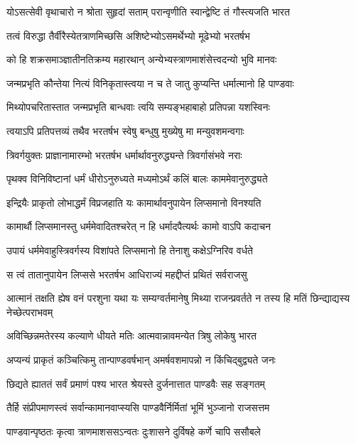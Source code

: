 \twolineshloka
{योऽसत्सेवी वृथाचारो न श्रोता सुहृदां सताम्}
{परान्वृणीति स्वान्द्वेष्टि तं गौस्त्यजति भारत}


\twolineshloka
{तत्वं विरुद्धा तैर्वीरैस्येतत्राणमिच्छसि}
{अशिष्टेभ्योऽसमर्थेभ्यो मूढेभ्यो भरतर्षभ}


\twolineshloka
{को हि शक्रसमाञ्ज्ञातीनतिक्रम्य महारथान्}
{अन्येभ्यस्त्राणमाशंसेत्त्वदन्यो भुवि मानवः}


\twolineshloka
{जन्मप्रभृति कौन्तेया नित्यं विनिकृतास्त्वया}
{न च ते जातु कुप्यन्ति धर्मात्मानो हि पाण्डवाः}


\twolineshloka
{मिथ्योपचरितास्तात जन्मप्रभृति बान्धवाः}
{त्वयि सम्यङ्भहाबाहो प्रतिपन्ना यशस्विनः}


\twolineshloka
{त्वयाऽपि प्रतिपत्तव्यं तथैव भरतर्षभ}
{स्वेषु बन्धुषु मुख्येषु मा मन्युवशमन्वगाः}


\twolineshloka
{त्रिवर्गयुक्तः प्राज्ञानामारम्भो भरतर्षभ}
{धर्मार्थावनुरुद्ध्यन्ते त्रिवर्गासंभवे नराः}


\twolineshloka
{पृथक्व विनिविष्टानां धर्मं धीरोऽनुरुध्यते}
{मध्यमोऽर्थं कलिं बालः काममेवानुरुद्ध्यते}


\twolineshloka
{इन्द्रियैः प्राकृतो लोभाद्धर्मं विप्रजहाति यः}
{कामार्थावनुपायेन लिप्समानो विनश्यति}


\twolineshloka
{कामार्थौ लिप्समानस्तु धर्ममेवादितश्चरेत्}
{न हि धर्मादपैत्यर्थः कामो वाऽपि कदाचन}


\twolineshloka
{उपायं धर्ममेवाहुस्त्रिवर्गस्य विशांपते}
{लिप्समानो हि तेनाशु कक्षेऽग्निरिव वर्धते}


\twolineshloka
{स त्वं तातानुपायेन लिप्ससे भरतर्षभ}
{आधिराज्यं महद्दीप्तं प्रथितं सर्वराजसु}


\threelineshloka
{आत्मानं तक्षति ह्येष वनं परशुना यथा}
{यः सम्यग्वर्तमानेषु मिथ्या राजन्प्रवर्तते}
{न तस्य हि मतिं छिन्द्याद्यस्य नेच्छेत्पराभवम्}


\twolineshloka
{अविच्छिन्नमतेरस्य कल्याणे धीयते मतिः}
{आत्मवान्नावमन्येत त्रिषु लोकेषु भारत}


\twolineshloka
{अप्यन्यं प्राकृतं कञ्चित्किमु तान्पाण्डवर्षभान्}
{अमर्षवशमापन्नो न किंचिद्बुद्व्यते जनः}


\twolineshloka
{छिद्यते ह्याततं सर्वं प्रमाणं पश्य भारत}
{श्रेयस्ते दुर्जनात्तात पाण्डवैः सह सङ्गतम्}


\twolineshloka
{तैर्हि संप्रीपमाणस्त्वं सर्वान्कामानवाप्स्यसि}
{पाण्डवैर्निर्मितां भूमिं भुञ्जानो राजसत्तम}


\twolineshloka
{पाण्डवान्पृष्ठतः कृत्वा त्राणमाशससऽन्वतः}
{दुःशासने दुर्विषहे कर्णे चापि ससौबले}


